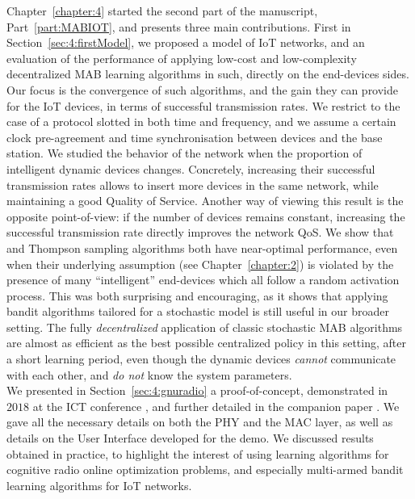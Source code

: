 Chapter~\ref{chapter:4} started the second part of the manuscript, Part~\ref{part:MABIOT}, and presents three main contributions.
%
First in Section~\ref{sec:4:firstModel}, we proposed a model of IoT networks,
and an evaluation of the performance of applying low-cost and low-complexity decentralized MAB learning algorithms in such, directly on the end-devices sides.
Our focus is the convergence of such algorithms, and the gain they can provide for the IoT devices, in terms of successful transmission rates.
We restrict to the case of a protocol slotted in both time and frequency, and we assume a certain clock pre-agreement and time synchronisation between devices and the base station.
We studied the behavior of the network when the proportion of intelligent dynamic devices changes.
Concretely, increasing their successful transmission rates allows to insert more devices in the same network, while maintaining a good Quality of Service.
Another way of viewing this result is the opposite point-of-view: if the number of devices remains constant, increasing the successful transmission rate directly improves the network QoS.
We show that \UCB{} and Thompson sampling algorithms both have near-optimal performance, even when their underlying \iid{} assumption (see Chapter~\ref{chapter:2}) is violated by the presence of many ``intelligent'' end-devices which all follow a random activation process.
%
This was both surprising and encouraging, as it shows that applying bandit algorithms tailored for a stochastic model is still useful in our broader setting.
The fully \emph{decentralized} application of classic stochastic MAB algorithms are almost as efficient as the best possible centralized policy in this setting, after a short learning period, even though the dynamic devices \emph{cannot} communicate with each other, and \emph{do not} know the system parameters.
\\
%
\indent
We presented in Section~\ref{sec:4:gnuradio} a proof-of-concept, demonstrated in $2018$ at the ICT conference \cite{Besson2018ICT}, and further detailed in the companion paper \cite{Besson2019WCNC}.
We gave all the necessary details on both the PHY and the MAC layer, as well as details on the User Interface developed for the demo.
We discussed results obtained in practice, to highlight the interest of using learning algorithms for cognitive radio online optimization problems, and especially multi-armed bandit learning algorithms for IoT networks.
